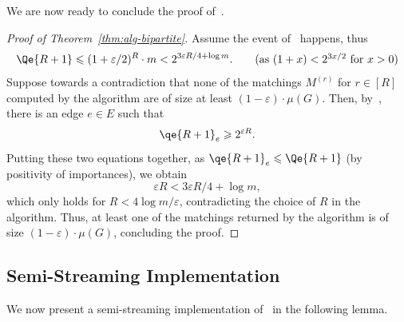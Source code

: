 \documentclass{theoretics}
\renewcommand{\leq}{\leqslant}
\renewcommand{\geq}{\geqslant}
\newcommand{\eps}{\varepsilon}
\begin{document}
We are now ready to conclude the proof of~. 

\begin{proof}[Proof of Theorem~\ref{thm:alg-bipartite}]
	Assume the event of~ happens, thus
	\begin{align*}
		\Qe{R+1} \leq (1+\eps/2)^{R} \cdot m < 2^{3\eps R/4 + \log{m}}. \tag{as $(1+x) < 2^{3x/2}$ for $x > 0$} 
	\end{align*}
	Suppose towards a contradiction that none of the matchings $M^{(r)}$ for $r \in [R]$ computed by the algorithm
	are of size at least $(1-\eps) \cdot \mu(G)$. Then, by~, there is an edge $e \in E$ such that 
	\[
		\qe{R+1}_e \geq 2^{\eps R}. 
	\]
	Putting these two equations together, as $\qe{R+1}_e \leq \Qe{R+1}$ (by positivity of importances), we obtain 
	\[
		\eps R < 3\eps R/4 + \log{m}, 
	\]
	which only holds for $R < 4\log{m}/\eps$, contradicting the choice of $R$ in the algorithm. Thus, at least one of the matchings returned by the algorithm is of size $(1-\eps) \cdot \mu(G)$, 
	concluding the proof. 
\end{proof}


\subsection*{Semi-Streaming Implementation}%

We now present a semi-streaming implementation of~ in the following lemma. 
\end{document}
